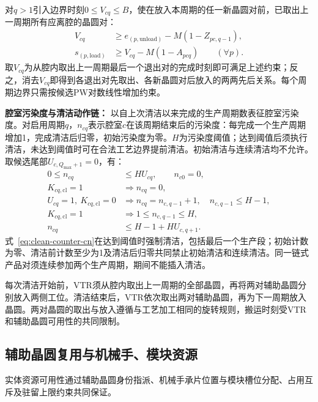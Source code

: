 \documentclass[preprint,12pt,nonatbib]{elsarticle}
\begin{document}
对$q>1$引入边界时刻$0\le V_{cq}\le B$，使在放入本周期的任一新晶圆对前，已取出上一周期所有应离腔的晶圆对：
\begin{equation}
\begin{aligned}
V_{cq}&\ge e_{(p,\mathrm{unload})}-M(1-Z_{pc,q-1}),\\
s_{(p,\mathrm{load})}&\ge V_{cq}-M(1-A_{pcq})\qquad(\forall p).
\end{aligned}
\label{eq:cycle-exchange-cn}
\end{equation}
取$V_{cq}$为从腔内取出上一周期最后一个退出对的完成时刻即可满足上述约束；反之，消去$V_{cq}$即得到各退出对先取出、各新晶圆对后放入的两两先后关系。每个周期边界只需按候选PW对数线性增加约束。

\noindent\textbf{腔室污染度与清洁动作链：}
以自上次清洁以来完成的生产周期数表征腔室污染度。对启用周期$q$，$n_{cq}$表示腔室$c$在该周期结束后的污染度：每完成一个生产周期增加1，完成清洁后归零，初始污染度为零。$H$为污染度阈值；达到阈值后须执行清洁，未达到阈值时可在合法工艺边界提前清洁。初始清洁与连续清洁均不允许。
取候选尾部$U_{c,Q_{\max}+1}=0$，有：
\begin{equation}
\begin{aligned}
0\le n_{cq}&\le H U_{cq},\qquad n_{c0}=0,\\
K_{cq,\mathrm{cl}}=1&\Rightarrow n_{cq}=0,\\
U_{cq}=1,\ K_{cq,\mathrm{cl}}=0
&\Rightarrow n_{cq}=n_{c,q-1}+1,\quad n_{c,q-1}\le H-1,\\
K_{cq,\mathrm{cl}}=1&\Rightarrow 1\le n_{c,q-1}\le H,\\
n_{cq}&\le H-1+H U_{c,q+1}.
\end{aligned}
\label{eq:clean-counter-cn}
\end{equation}
式~\eqref{eq:clean-counter-cn}在达到阈值时强制清洁，包括最后一个生产段；初始计数为零、清洁前计数至少为1及清洁后归零共同禁止初始清洁和连续清洁。同一链式产品对须连续参加两个生产周期，期间不能插入清洁。

每次清洁开始前，VTR须从腔内取出上一周期的全部晶圆，再将两对辅助晶圆分别放入两侧工位。清洁结束后，VTR依次取出两对辅助晶圆，再为下一周期放入晶圆。两对晶圆的取出与放入遵循与工艺加工相同的旋转规则，搬运时刻受VTR和辅助晶圆可用性的共同限制。

\FloatBarrier
\subsection{辅助晶圆复用与机械手、模块资源}
\label{sec:model-resource-cn}

实体资源可用性通过辅助晶圆身份指派、机械手承片位置与模块槽位分配、占用互斥及驻留上限约束共同保证。
\end{document}
